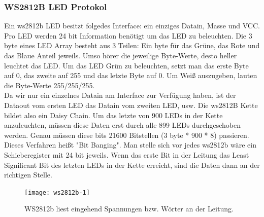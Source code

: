 \documentclass[12pt,a4paper]{article}
\begin{document}
\subsubsection{WS2812B LED Protokol}
Ein ws2812b LED besitzt folgedes Interface: ein einziges Data\textunderscore in, Masse und VCC. Pro LED werden 24 bit Information benötigt um das LED zu beleuchten. Die 3 byte eines LED Array besteht aus 3 Teilen: Ein byte für das Grüne, das Rote und das Blaue Anteil jeweils. Umso hörer die jeweilige Byte-Werte, desto heller leuchtet das LED. Um das LED Grün zu beleuchten, setzt man das erste Byte auf 0, das zweite auf 255 und das letzte Byte auf 0. Um Weiß auszugeben, lauten die Byte-Werte 255/255/255.
\vspace{1ex}\\
Da wir nur ein einzelnes Data\textunderscore in am Interface zur Verfügung haben, ist der Data\textunderscore out vom ersten LED das Data\textunderscore in vom zweiten LED, usw. Die ws2812B Kette bildet also ein Daisy Chain. Um das letzte von 900 LEDs in der Kette anzuleuchten, müssen diese Daten erst durch alle 899 LEDs durchgeschoben werden. Genau müssen diese bits 21600 Bitstellen (3 byte * 900 * 8) passieren. Dieses Verfahren heißt "Bit Banging". Man stelle sich vor jedes ws2812b wäre ein Schieberegister mit 24 bit jeweils. Wenn das erste Bit in der Leitung das Least Significant Bit des letzten LEDs in der Kette erreicht, sind die Daten dann an der richtigen Stelle.

	\begin{figure}[h]
	\centering
	\texttt{[image: ws2812b-1]}
	\caption{\label{fig:Oscillosope}WS2812b liest eingehend Spannungen bzw. Wörter an der Leitung.}
	\end{figure}
\end{document}
